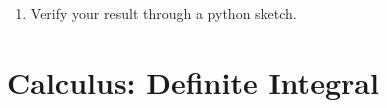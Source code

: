 \documentclass[journal,12pt,twocolumn]{IEEEtran}
\renewcommand\thesection{\arabic{section}}
\begin{document}
\begin{enumerate}[label=\thesection.\arabic*
,ref=\thesection.\theenumi]
\begin{align}
z = \sqrt{1-x^2},
dz &= -\frac{x}{\sqrt{1-x^2}}\, dx
\nonumber \\
\implies \int\frac{\sqrt{1-x^2}}{ x}\,dx &= -\int\frac{z^2}{ 1-z^2}\,dz
\nonumber \\
 &= \int\,dz-\int\frac{1}{ 1-z^2}\,dz
\nonumber \\
 &= z + \frac{1}{2}\ln \frac{1-z}{1+z} + C
\end{align}
Thus, 
\begin{align}
y = \pm \brak{\sqrt{1-x^2} + \frac{1}{2}\ln \frac{1-\sqrt{1-x^2}}{1+\sqrt{1-x^2}}} 
\end{align}
since $C=0$ after substituting $x=0, y = 1$.
\item Verify your result through a python sketch.
\end{enumerate}
\section{Calculus: Definite Integral}
\end{document}
